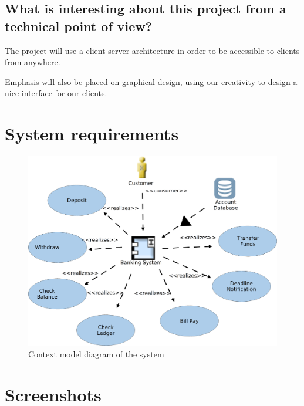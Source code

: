 \documentclass[
10pt, %
a4paper, %
oneside, %
headinclude,footinclude, %
BCOR5mm, %
]{scrartcl}
\begin{document}
\subsection{What is interesting about this project from a technical
point of
view?}

The project will use a client-server architecture in order to be
accessible to clients from anywhere.

Emphasis will also be placed on graphical design, using our creativity
to design a nice interface for our clients.

\section{System requirements}

\begin{figure}[H]
  \centering
    \includegraphics[width=\textwidth]{context_model.png}
  \caption{Context model diagram of the system}
\end{figure}

\appendix

\section{Screenshots}
\end{document}
